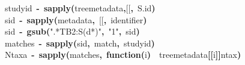 \documentclass[authoryear, preprint]{elsarticle}
\makeatletter
\newcommand{\hlfunctioncall}[1]{\textcolor[rgb]{.5,0,.33}{\textbf{#1}}}%
\newcommand{\hlstring}[1]{\textcolor[rgb]{.6,.6,1}{#1}}%
\newcommand{\hlkeyword}[1]{\textbf{#1}}%
\newcommand{\hlargument}[1]{\textcolor[rgb]{.69,.25,.02}{#1}}%
\newcommand{\hlformalargs}[1]{\hlargument{#1}}%
\newcommand{\hlassignement}[1]{\textbf{#1}}%
\newcommand{\hlsymbol}[1]{#1}%
\newcommand{\hlstd}[1]{\textcolor[rgb]{0,0,0}{#1}}%
\newenvironment{kframe}{%
 \def\FrameCommand##1{\hskip\@totalleftmargin \hskip-\fboxsep
 \colorbox{shadecolor}{##1}\hskip-\fboxsep
     \hskip-\linewidth \hskip-\@totalleftmargin \hskip\columnwidth}%
 \MakeFramed {\advance\hsize-\width
   \@totalleftmargin\z@ \linewidth\hsize
   \@setminipage}}%
 {\par\unskip\endMakeFramed}
\newenvironment{knitrout}{}{} %
\makeatother
\begin{document}
\begin{figure}

\begin{knitrout}
\color{fgcolor}\begin{kframe}
\begin{flushleft}
\ttfamily\noindent
\hlsymbol{studyid}{\ }\hlassignement{\usebox{\hlnormalsizeboxlessthan}-}{\ }\hlfunctioncall{sapply}\hlkeyword{(}\hlsymbol{tree\usebox{\hlnormalsizeboxunderscore}metadata}\hlkeyword{,}\hlsymbol{\usebox{\hlnormalsizeboxbacktick}[[\usebox{\hlnormalsizeboxbacktick}}\hlkeyword{,}{\ }\hlstring{\usebox{\hlnormalsizeboxsinglequote}S.id\usebox{\hlnormalsizeboxsinglequote}}\hlkeyword{)}\hspace*{\fill}\\
\hlstd{}\hlsymbol{sid}{\ }\hlassignement{\usebox{\hlnormalsizeboxlessthan}-}{\ }\hlfunctioncall{sapply}\hlkeyword{(}\hlsymbol{metadata}\hlkeyword{,}{\ }\hlsymbol{\usebox{\hlnormalsizeboxbacktick}[[\usebox{\hlnormalsizeboxbacktick}}\hlkeyword{,}{\ }\hlstring{\usebox{\hlnormalsizeboxsinglequote}identifier\usebox{\hlnormalsizeboxsinglequote}}\hlkeyword{)}\hspace*{\fill}\\
\hlstd{}\hlsymbol{sid}{\ }\hlassignement{\usebox{\hlnormalsizeboxlessthan}-}{\ }\hlfunctioncall{gsub}\hlkeyword{(}\hlstring{"{}.*TB2:S(\usebox{\hlnormalsizeboxbackslash}\usebox{\hlnormalsizeboxbackslash}d*)"{}}\hlkeyword{,}{\ }\hlstring{"{}\usebox{\hlnormalsizeboxbackslash}\usebox{\hlnormalsizeboxbackslash}1"{}}\hlkeyword{,}{\ }\hlsymbol{sid}\hlkeyword{)}\hspace*{\fill}\\
\hlstd{}\hlsymbol{matches}{\ }\hlassignement{\usebox{\hlnormalsizeboxlessthan}-}{\ }\hlfunctioncall{sapply}\hlkeyword{(}\hlsymbol{sid}\hlkeyword{,}{\ }\hlsymbol{match}\hlkeyword{,}{\ }\hlsymbol{studyid}\hlkeyword{)}\hspace*{\fill}\\
\hlstd{}\hlsymbol{Ntaxa}{\ }\hlassignement{\usebox{\hlnormalsizeboxlessthan}-}{\ }\hlfunctioncall{sapply}\hlkeyword{(}\hlsymbol{matches}\hlkeyword{,}{\ }\hlkeyword{function}\hlkeyword{(}\hlformalargs{i}\hlkeyword{)}{\ }{\ }\hlsymbol{tree\usebox{\hlnormalsizeboxunderscore}metadata}\hlkeyword{[[}\hlsymbol{i}\hlkeyword{]}\hlkeyword{]}\hlkeyword{\usebox{\hlnormalsizeboxdollar}}\hlsymbol{ntax}\hlkeyword{)}\hspace*{\fill}\\

\end{flushleft}
\end{kframe}
\end{knitrout}
\end{figure}
\end{document}
